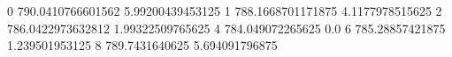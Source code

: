 0 790.0410766601562 5.99200439453125
1 788.1668701171875 4.1177978515625
2 786.0422973632812 1.99322509765625
4 784.049072265625 0.0
6 785.28857421875 1.239501953125
8 789.7431640625 5.694091796875
